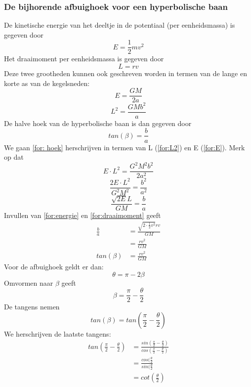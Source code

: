 \subsubsection{De bijhorende afbuighoek voor een hyperbolische baan}
De kinetische energie van het deeltje in de potentiaal (per eenheidsmassa) is gegeven door 
\begin{equation}
    E=\frac{1}{2}mv^{2}
    \label{for:energie}
\end{equation}
Het draaimoment per eenheidsmassa is gegeven door
\begin{equation}
    L=rv
    \label{for:draaimoment}
\end{equation}
Deze twee grootheden kunnen ook geschreven worden in termen van de lange en korte as van de kegelsneden:
\begin{equation}
    E = \frac{GM}{2a}
    \label{for:E}
\end{equation}
\begin{equation}
    L^2 = \frac{GMb^{2}}{a}
    \label{for:L2}
\end{equation}
De halve hoek van de hyperbolische baan is dan gegeven door 
\begin{equation}
    tan(\beta) = \frac{b}{a}
    \label{for: hoek}
\end{equation}
We gaan \cref{for: hoek} herschrijven in termen van L (\cref{for:L2}) en E (\cref{for:E}).
Merk op dat
$$E\cdot L^{2}=\frac{G^{2}M^{2}b^{2}}{2a^{2}}$$
$$\frac{2E\cdot L^{2}}{G^{2}M^{2}}=\frac{b^{2}}{a^{2}}$$
$$\frac{\sqrt{2E}L}{GM}=\frac{b}{a}$$
Invullen van \cref{for:energie} en \cref{for:draaimoment} geeft
\begin{align}
    \frac{b}{a}&=\frac{\sqrt{2\cdot\frac{1}{2}v^{2}}rv}{GM} \nonumber \\
    &= \frac{rv^{2}}{GM} \nonumber \\
    tan(\beta) &=\frac{rv^{2}}{GM} 
    \label{for:tangens}
\end{align}
Voor de afbuighoek geldt er dan:
$$\theta = \pi - 2\beta$$
Omvormen naar $\beta$ geeft
$$\beta = \frac{\pi}{2}-\frac{\theta}{2}$$
De tangens nemen
\begin{equation}
    tan(\beta) = tan(\frac{\pi}{2}-\frac{\theta}{2})
    \label{for:tan}
\end{equation}
We herschrijven de laatste tangens:
\begin{align}
    tan(\frac{\pi}{2}-\frac{\theta}{2})&=\frac{sin(\frac{\pi}{2}-\frac{\theta}{2})}{cos(\frac{\pi}{2}-\frac{\theta}{2})}\nonumber\\
    &= \frac{cos(\frac{\theta}{2}}{sin(\frac{\theta}{2}}\nonumber \\
    & = cot(\frac{\theta}{2})
    \label{for:cot}
\end{align}

